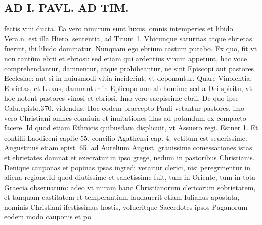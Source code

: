 \documentclass{article}
\begin{document}
\begin{pages}
\section*{AD I. PAVL. AD TIM. }
\marginpar{[ p.132 ]}\pstart fectis vini ducta. Ea vero nimirum sunt luxus, omnis intemperies et libido. Vera.n. est illa Hiero. sententia, ad Titum 1. Vbicunque saturitas atque ebrietas fuerint, ibi libido dominatur. Nunquam ego ebrium castum putabo. Fx quo, fit vt non tantùm ebrii et ebriosi: sed etiam qui ardentius vinum appetunt, hac voce comprehendantur, damnentur, atque prohibeantur, ne sint Episcopi aut pastores Ecclesiae: aut si in huiusmodi vitia inciderint, vt deponantur. Quare Vinolentia, Ebrietas, et Luxus, damnantur in Eplicopo non ab homine: sed a Dei spiritu, vt hoc notent pastores vinosi et ebriosi. Imo vero saepissime ebrii. De quo ipse Calu.episto.370. videndus.  \pend\pstart Hoc eodem praecepto Pauli vetantur pastores, imo vero Christiani omnes conuiuia et inuitationes illas ad potandum ex compacto facere. Id quod etiam Ethnicis quibusdam displicuit, vt Assuero regi. Estner 1. Et contilii Laodiceni capite 55. concilio Agathensi cap. 4. vetitum est seuerissime. Augustinus etiam epist. 65. ad Aurelium August. grauissime comessationes istas et ebrietates damnat et execratur in ipso grege, nedum in pastoribus Christianis.  \pend\pstart Denique  cauponas et popinas ipsas ingredi vetaitur clerici, nisi peregrinentur in aliena regione.Id quod diutissime et sanctissime fuit, tum in Oriente, tum in tota Graecia obseruatum: adeo vt miram hanc Christianorum clericorum sobrietatem, et tanquam castitatem et temperantiam laudauerit etiam Iulianus apostata, nominis Christiani ifestissimus hostis, volueritque  Sacerdotes ipsos Paganorum eodem modo cauponis et po\pend

\end{pages}
\end{document}
